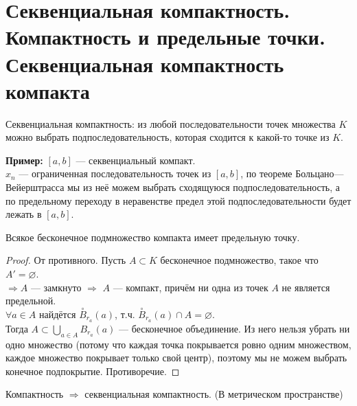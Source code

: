 \section{Секвенциальная компактность. Компактность и предельные точки. Секвенциальная компактность компакта}

\begin{conj}
    Секвенциальная компактность: из любой последовательности точек множества
    $K$ можно выбрать подпоследовательность, которая сходится к какой-то точке из $K$.
\end{conj}

\textbf{Пример:}
    $[a,b]$ --- секвенциальный компакт. \\
    $x_n$ --- ограниченная последовательность точек из $[a,b]$, по теореме
    Больцано—Вейерштрасса мы из неё можем выбрать сходящуюся подпоследовательность, а
    по предельному переходу в неравенстве предел этой подпоследовательности будет лежать в $[a,b]$.
    
\begin{theorem-non}
    Всякое бесконечное подмножество компакта имеет предельную точку.

    \begin{proof}
        От противного. Пусть $A \subset K$ бесконечное подмножество, такое что $A' = \varnothing$. \\
        $\Longrightarrow A$ --- замкнуто $\Longrightarrow$ $A$ --- компакт, причём ни одна из точек $A$ не является предельной. \\
        $\forall a \in A$ найдётся $\overset{\circ}{B}_{r_a}(a)$, т.ч. $\overset{\circ}{B}_{r_a}(a) \cap A = \varnothing$. \\
        Тогда $A \subset \bigcup\limits_{a\in A} B_{r_a}(a)$ --- бесконечное объединение.
        Из него нельзя убрать ни одно множество (потому что каждая точка покрывается ровно одним множеством, каждое множество покрывает только свой центр), поэтому мы не можем выбрать конечное подпокрытие. Противоречие.
    \end{proof}

\end{theorem-non}
    
\follow \; Компактность $\Longrightarrow$ секвенциальная компактность. (В метрическом пространстве)

